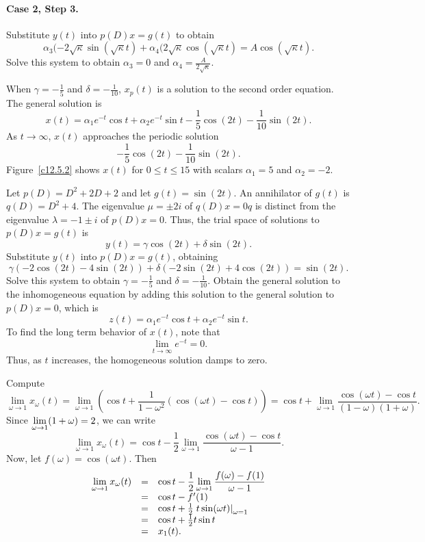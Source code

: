 \paragraph{Case 2, Step 3.} Substitute $y(t)$ into $p(D)x = g(t)$ to obtain
\[
\alpha_3(-2\sqrt{\kappa}\sin(\sqrt{\kappa}t) +
\alpha_4(2\sqrt{\kappa}\cos(\sqrt{\kappa}t)
= A\cos(\sqrt{\kappa}t).
\]
Solve this system to obtain $\alpha_3 = 0$ and
$\alpha_4 = \frac{A}{2\sqrt{\kappa}}$.


 \ans When $\gamma = -\frac{1}{5}$ and $\delta = -\frac{1}{10}$,
$x_p(t)$ is a solution to the second order equation.  The general solution
is
\[
x(t) = \alpha_1e^{-t}\cos t + \alpha_2e^{-t}\sin t
- \frac{1}{5}\cos(2t) - \frac{1}{10}\sin(2t).
\]
As $t \rightarrow \infty$, $x(t)$ approaches the periodic solution
\[
- \frac{1}{5}\cos(2t) - \frac{1}{10}\sin(2t).
\]
Figure~\ref{c12.5.2} shows $x(t)$ for $0 \leq t \leq 15$ with scalars
$\alpha_1 = 5$ and $\alpha_2 = -2$.

\soln Let $p(D) = D^2 + 2D + 2$ and let $g(t) = \sin(2t)$.  An annihilator
of $g(t)$ is $q(D) = D^2 + 4$.  The eigenvalue $\mu = \pm 2i$ of
$q(D)x = 0q$ is distinct from the eigenvalue $\lambda = -1 \pm i$ of
$p(D)x = 0$.  Thus, the trial space of solutions to $p(D)x = g(t)$ is
\[
y(t) = \gamma\cos(2t) + \delta\sin(2t).
\]
Substitute $y(t)$ into $p(D)x = g(t)$, obtaining
\[
\gamma(-2\cos(2t) - 4\sin(2t)) + \delta(-2\sin(2t) + 4\cos(2t)) = \sin(2t).
\]
Solve this system to obtain $\gamma = -\frac{1}{5}$ and
$\delta = -\frac{1}{10}$.  Obtain the general solution to the inhomogeneous
equation by adding this solution to the general solution to $p(D)x = 0$,
which is
\[
z(t) = \alpha_1e^{-t}\cos t + \alpha_2e^{-t}\sin t.
\]
To find the long term behavior of $x(t)$, note that
\[
\lim_{t \rightarrow \infty}e^{-t} = 0.
\]
Thus, as $t$ increases, the homogeneous solution damps to zero. 

\begin{figure}[htb]
                       \centerline{%
                       }
\end{figure}


Compute
\[
\lim_{\omega \rightarrow 1} x_\omega(t) =
\lim_{\omega \rightarrow 1}\left(\cos t + \frac{1}{1 - \omega^2}
(\cos(\omega t) - \cos t)\right) =
\cos t + \lim_{\omega \rightarrow 1}\frac{\cos(\omega t) - \cos t}
{(1 - \omega)(1 + \omega)}.
\]
Since $\displaystyle \lim_{\omega \rightarrow 1}(1 + \omega) = 2$, we can write
\[
\lim_{\omega \rightarrow 1} x_\omega(t) =
\cos t - \frac{1}{2}\lim_{\omega \rightarrow 1}
\frac{\cos(\omega t) - \cos t}{\omega - 1}.
\]
Now, let $f(\omega) = \cos(\omega t)$.  Then
\[
\begin{array}{rcl}
\displaystyle \lim_{\omega \rightarrow 1} x_\omega(t) & = &
\cos t - \displaystyle \frac{1}{2}\lim_{\omega \rightarrow 1}
\frac{f(\omega) - f(1)}{\omega - 1} \\
& = & \cos t - f'(1) \\
& = & \cos t + \frac{1}{2}\left.t\sin(\omega t)\right|_{\omega = 1} \\
& = & \cos t + \frac{1}{2}t\sin t \\
& = & x_1(t).
\end{array}
\]

